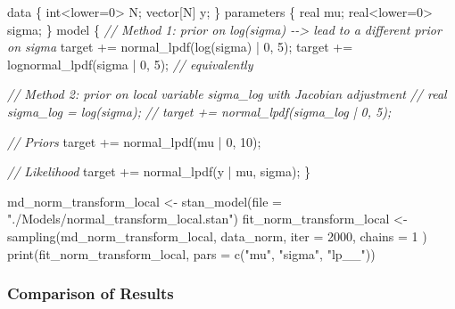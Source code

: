 \documentclass[
  letterpaper,
  DIV=11,
  numbers=noendperiod]{scrartcl}
\newenvironment{Shaded}{}{}
\newcommand{\AttributeTok}[1]{\textcolor[rgb]{0.65,0.15,0.64}{#1}}
\newcommand{\CommentTok}[1]{\textcolor[rgb]{0.63,0.63,0.65}{\textit{#1}}}
\newcommand{\DataTypeTok}[1]{\textcolor[rgb]{0.65,0.15,0.64}{#1}}
\newcommand{\DecValTok}[1]{\textcolor[rgb]{0.60,0.41,0.00}{#1}}
\newcommand{\FunctionTok}[1]{\textcolor[rgb]{0.25,0.47,0.95}{#1}}
\newcommand{\KeywordTok}[1]{\textcolor[rgb]{0.65,0.15,0.64}{#1}}
\newcommand{\NormalTok}[1]{\textcolor[rgb]{0.22,0.23,0.26}{#1}}
\newcommand{\OtherTok}[1]{\textcolor[rgb]{0.15,0.68,0.38}{#1}}
\newcommand{\StringTok}[1]{\textcolor[rgb]{0.31,0.63,0.31}{#1}}
\begin{document}
\begin{Shaded}
\begin{Highlighting}[]
\KeywordTok{data}\NormalTok{ \{}
  \DataTypeTok{int}\NormalTok{\textless{}}\KeywordTok{lower}\NormalTok{=}\DecValTok{0}\NormalTok{\textgreater{} N;}
  \DataTypeTok{vector}\NormalTok{[N] y;}
\NormalTok{\}}
\KeywordTok{parameters}\NormalTok{ \{}
  \DataTypeTok{real}\NormalTok{ mu;}
  \DataTypeTok{real}\NormalTok{\textless{}}\KeywordTok{lower}\NormalTok{=}\DecValTok{0}\NormalTok{\textgreater{} sigma;}
\NormalTok{\}}
\KeywordTok{model}\NormalTok{ \{}
  \CommentTok{// Method 1: prior on log(sigma) {-}{-}\textgreater{} lead to a different prior on sigma}
  \KeywordTok{target +=}\NormalTok{ normal\_lpdf(log(sigma) | }\DecValTok{0}\NormalTok{, }\DecValTok{5}\NormalTok{);}
  \KeywordTok{target +=}\NormalTok{ lognormal\_lpdf(sigma | }\DecValTok{0}\NormalTok{, }\DecValTok{5}\NormalTok{); }\CommentTok{// equivalently}

  \CommentTok{// Method 2: prior on local variable sigma\_log with Jacobian adjustment}
  \CommentTok{// real sigma\_log = log(sigma);}
  \CommentTok{// target += normal\_lpdf(sigma\_log | 0, 5);}

  \CommentTok{// Priors}
  \KeywordTok{target +=}\NormalTok{ normal\_lpdf(mu | }\DecValTok{0}\NormalTok{, }\DecValTok{10}\NormalTok{);}

  \CommentTok{// Likelihood}
  \KeywordTok{target +=}\NormalTok{ normal\_lpdf(y | mu, sigma);}
\NormalTok{\}}
\end{Highlighting}
\end{Shaded}

\begin{Shaded}
\begin{Highlighting}[]
\NormalTok{md\_norm\_transform\_local }\OtherTok{\textless{}{-}} \FunctionTok{stan\_model}\NormalTok{(}\AttributeTok{file =} \StringTok{"./Models/normal\_transform\_local.stan"}\NormalTok{)}
\NormalTok{fit\_norm\_transform\_local }\OtherTok{\textless{}{-}} \FunctionTok{sampling}\NormalTok{(md\_norm\_transform\_local, data\_norm,}
  \AttributeTok{iter =} \DecValTok{2000}\NormalTok{, }\AttributeTok{chains =} \DecValTok{1}
\NormalTok{)}
\FunctionTok{print}\NormalTok{(fit\_norm\_transform\_local, }\AttributeTok{pars =} \FunctionTok{c}\NormalTok{(}\StringTok{"mu"}\NormalTok{, }\StringTok{"sigma"}\NormalTok{, }\StringTok{"lp\_\_"}\NormalTok{))}
\end{Highlighting}
\end{Shaded}

\subsubsection{Comparison of Results}\label{comparison-of-results}
\end{document}

